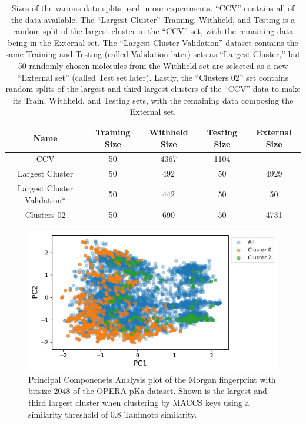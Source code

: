 \documentclass[journal=jmcmar,manuscript=article]{achemso}
\begin{document}
\begin{table}[]
    \centering
    \begin{tabular}{c|c|c|c|c}
    \hline
        Name & Training Size & Withheld Size & Testing Size & External Size \\
    \hline
        CCV & 50 & 4367 & 1104 & -- \\
        Largest Cluster & 50 & 492 & 50 & 4929 \\
        Largest Cluster Validation* & 50 & 442 & 50 & 50 \\
        Clusters 02 & 50 & 690 & 50 & 4731 \\
    \hline
    \end{tabular}
    \caption{Sizes of the various data splits used in our experiments. ``CCV'' contains all of the data available. The ``Largest Cluster'' Training, Withheld, and Testing is a random split of the largest cluster in the ``CCV'' set, with the remaining data being in the External set. The ``Largest Cluster Validation'' dataset contains the same Training and Testing (called Validation later) sets as ``Largest Cluster,'' but 50 randomly chosen molecules from the Withheld set are selected as a new ``External set'' (called Test set later). Lastly, the ``Clusters 02'' set contains random splits of the largest and third largest clusters of the ``CCV'' data to make its Train, Withheld, and Testing sets, with the remaining data composing the External set.}
    \label{tab:datasets}
\end{table}

\begin{figure}[tbph]
    \centering
    \includegraphics[width=.6\linewidth]{figures/fig1_pca.pdf}
    \caption{Principal Componenets Analysis plot of the Morgan fingerprint with bitsize 2048 of the OPERA pKa dataset. Shown is the largest and third largest cluster when clustering by MACCS keys using a similarity threshold of 0.8 Tanimoto similarity.}
    \label{fig:pcaclusters}
\end{figure}
\end{document}

